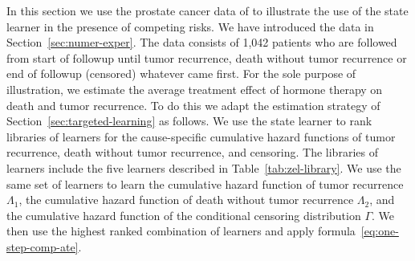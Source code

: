 \documentclass[numsec,webpdf,contemporary,medium,namedate]{oup-authoring-template}%
\theoremstyle{thmstyleone}%
\theoremstyle{thmstyletwo}%
\theoremstyle{thmstylethree}%
\newcommand{\1}{\mathds{1}}
\begin{document}
In this section we use the prostate cancer data of
\cite{kattan2000pretreatment} to illustrate the use of the state
learner in the presence of competing risks. We have introduced the
data in Section~\ref{sec:numer-exper}. The data consists of 1,042
patients who are followed from start of followup until tumor
recurrence, death without tumor recurrence or end of followup
(censored) whatever came first. For the sole purpose of illustration,
we estimate the average treatment effect of hormone therapy on death
and tumor recurrence. To do this we adapt the estimation strategy of
Section~\ref{sec:targeted-learning} as follows.  We use the state
learner to rank libraries of learners for the cause-specific
cumulative hazard functions of tumor recurrence, death without tumor
recurrence, and censoring.  The libraries of learners include the five
learners described in Table~\ref{tab:zel-library}.  We use the same
set of learners to learn the cumulative hazard function of tumor
recurrence \( \Lambda_1 \), the cumulative hazard function of death
without tumor recurrence \( \Lambda_2 \), and the cumulative hazard
function of the conditional censoring distribution $\Gamma$. 
We then use the highest ranked combination
of learners and apply formula~\eqref{eq:one-step-comp-ate}.
\end{document}
